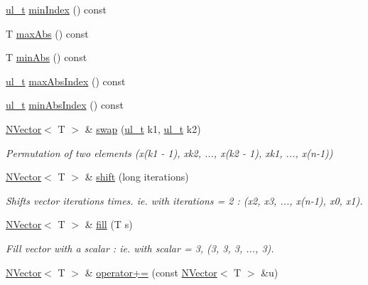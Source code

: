 \begin{DoxyCompactItemize}
\mbox{\hyperlink{typedef_8h_a1b140a2034db3f5dfe18a987745df43a}{ul\+\_\+t}} \mbox{\hyperlink{class_n_vector_aea9d0e6c8b20628b5e09f8194484a8d3}{min\+Index}} () const
\item 
T \mbox{\hyperlink{class_n_vector_a2d77a1ff10574ae5ca33fb3c11a087e2}{max\+Abs}} () const
\item 
T \mbox{\hyperlink{class_n_vector_a857878b360cede51eb87924cd46d5a54}{min\+Abs}} () const
\item 
\mbox{\hyperlink{typedef_8h_a1b140a2034db3f5dfe18a987745df43a}{ul\+\_\+t}} \mbox{\hyperlink{class_n_vector_ac7d7d39b68956da9018684a3706a70c2}{max\+Abs\+Index}} () const
\item 
\mbox{\hyperlink{typedef_8h_a1b140a2034db3f5dfe18a987745df43a}{ul\+\_\+t}} \mbox{\hyperlink{class_n_vector_a8b9147431ee1f9c5a25c6e0b2f793c40}{min\+Abs\+Index}} () const
\item 
\mbox{\hyperlink{class_n_vector}{N\+Vector}}$<$ T $>$ \& \mbox{\hyperlink{class_n_vector_a8ea2e2cffa2c3053d835d05a571dac88}{swap}} (\mbox{\hyperlink{typedef_8h_a1b140a2034db3f5dfe18a987745df43a}{ul\+\_\+t}} k1, \mbox{\hyperlink{typedef_8h_a1b140a2034db3f5dfe18a987745df43a}{ul\+\_\+t}} k2)
\begin{DoxyCompactList}\small\item\em Permutation of two elements (x(k1 -\/ 1), xk2, ..., x(k2 -\/ 1), xk1, ..., x(n-\/1)) \end{DoxyCompactList}\item 
\mbox{\hyperlink{class_n_vector}{N\+Vector}}$<$ T $>$ \& \mbox{\hyperlink{class_n_vector_aabe8585ef2659ce3fa7872c2b96e3b20}{shift}} (long iterations)
\begin{DoxyCompactList}\small\item\em Shifts vector iterations times. ie. with iterations = 2 \+: (x2, x3, ..., x(n-\/1), x0, x1). \end{DoxyCompactList}\item 
\mbox{\hyperlink{class_n_vector}{N\+Vector}}$<$ T $>$ \& \mbox{\hyperlink{class_n_vector_ae0e51edea3a6e998c5b6ff5336939e90}{fill}} (T s)
\begin{DoxyCompactList}\small\item\em Fill vector with a scalar \+: ie. with scalar = 3, (3, 3, 3, ..., 3). \end{DoxyCompactList}\item 
\mbox{\hyperlink{class_n_vector}{N\+Vector}}$<$ T $>$ \& \mbox{\hyperlink{class_n_vector_a493c3ac08bab3361ad475fc0360ee489}{operator+=}} (const \mbox{\hyperlink{class_n_vector}{N\+Vector}}$<$ T $>$ \&u)

\end{DoxyCompactItemize}
